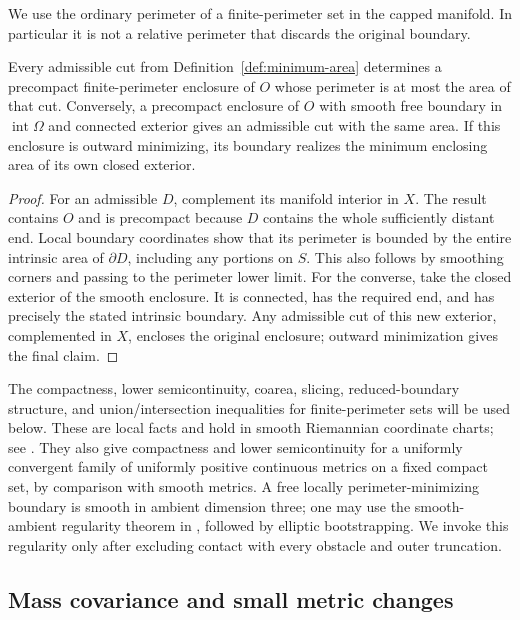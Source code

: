 We use the ordinary perimeter of a finite-perimeter set in the capped
manifold. In particular it is not a relative perimeter that discards
the original boundary.

\begin{lemma}\label{lem:cut-enclosure}
Every admissible cut from Definition~\ref{def:minimum-area} determines
a precompact finite-perimeter enclosure of $O$ whose perimeter is at
most the area of that cut. Conversely, a precompact enclosure of $O$
with smooth free boundary in $\operatorname{int}\Omega$ and connected
exterior gives an admissible cut with the same area. If this enclosure
is outward minimizing, its boundary realizes the minimum enclosing
area of its own closed exterior.
\end{lemma}
\begin{proof}
For an admissible $D$, complement its manifold interior in $X$.
The result contains $O$ and is precompact because $D$ contains the
whole sufficiently distant end. Local boundary coordinates show that
its perimeter is bounded by the entire intrinsic area of $\partial D$,
including any portions on $S$. This also follows by smoothing corners
and passing to the perimeter lower limit. For the converse, take the
closed exterior of the smooth enclosure. It is connected, has the
required end, and has precisely the stated intrinsic boundary.
Any admissible cut of this new exterior, complemented in $X$, encloses
the original enclosure; outward minimization gives the final claim.
\end{proof}

The compactness, lower semicontinuity, coarea, slicing, reduced-boundary
structure, and union/intersection inequalities for finite-perimeter
sets will be used below. These are local facts and hold in smooth
Riemannian coordinate charts; see \citet[Chapters 12--18]{Maggi2012}.
They also give compactness and lower semicontinuity for a uniformly
convergent family of uniformly positive continuous metrics on a fixed
compact set, by comparison with smooth metrics. A free locally
perimeter-minimizing boundary is smooth in ambient dimension three;
one may use the smooth-ambient regularity theorem in
\citet[Chapter 7, Section 5, Theorem 5.8]{Simon2014}, followed by
elliptic bootstrapping. We invoke this regularity only after excluding
contact with every obstacle and outer truncation.

\subsection{Mass covariance and small metric changes}

